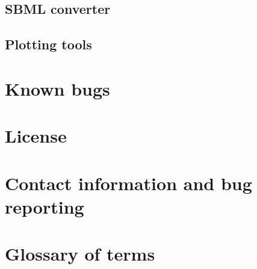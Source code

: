 \documentclass[11pt,letterpaper]{article}
\begin{document}
\subsection{SBML converter}
\subsection{Plotting tools}

\section{Known bugs}

\section{License}

\section{Contact information and bug reporting}

\clearpage
\section{Glossary of terms}
\end{document}
